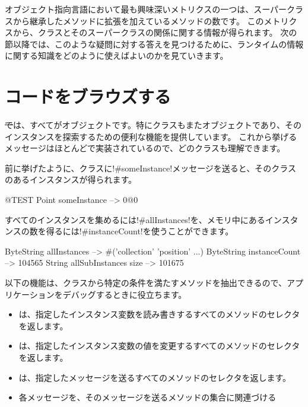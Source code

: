 \documentclass[a4paper,10pt,twoside]{book}
\begin{document}
オブジェクト指向言語において最も興味深いメトリクスの一つは、スーパークラスから継承したメソッドに拡張を加えているメソッドの数です。
このメトリクスから、クラスとそのスーパークラスの関係に関する情報が得られます。
次の節以降では、このような疑問に対する答えを見つけるために、ランタイムの情報に関する知識をどのように使えばよいのかを見ていきます。

\section{コードをブラウズする}

\st では、すべてがオブジェクトです。特にクラスもまたオブジェクトであり、そのインスタンスを探索するための便利な機能を提供しています。
これから挙げるメッセージはほとんどで実装されているので、どのクラスも理解できます。

前に挙げたように、クラスに\ct!#someInstance!メッセージを送ると、そのクラスのあるインスタンスが得られます。
\begin{code}{@TEST} %
Point someInstance --> 0@0
\end{code}

すべてのインスタンスを集めるには\ct!#allInstances!を、メモリ中にあるインスタンスの数を得るには\ct!#instanceCount!を使うことができます。

\begin{code}{} %
ByteString allInstances        --> #('collection' 'position'  ...)
ByteString instanceCount    --> 104565
String allSubInstances size -->  101675
\end{code}

以下の機能は、クラスから特定の条件を満たすメソッドを抽出できるので、アプリケーションをデバッグするときに役立ちます。
\begin{itemize}
\item {} は、指定したインスタンス変数を読み書きするすべてのメソッドのセレクタを返します。
\item {} は、指定したインスタンス変数の値を変更するすべてのメソッドのセレクタを返します。
\item {} は、指定したメッセージを送るすべてのメソッドのセレクタを返します。
\item {} 各メッセージを、そのメッセージを送るメソッドの集合に関連づける %
\end{itemize}
\end{document}
